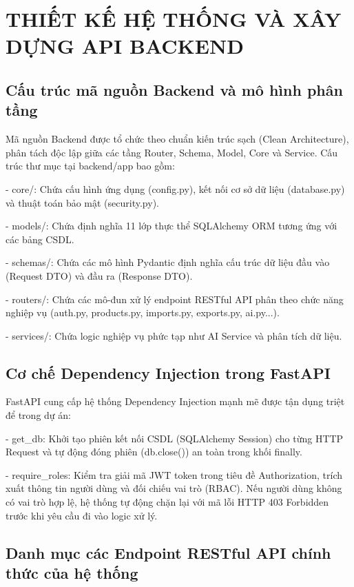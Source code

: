 \chapter{THIẾT KẾ HỆ THỐNG VÀ XÂY DỰNG API BACKEND}

\section{Cấu trúc mã nguồn Backend và mô hình phân tầng}

Mã nguồn Backend được tổ chức theo chuẩn kiến trúc sạch (Clean Architecture), phân tách độc lập giữa các tầng Router, Schema, Model, Core và Service. Cấu trúc thư mục tại backend/app bao gồm:

- core/: Chứa cấu hình ứng dụng (config.py), kết nối cơ sở dữ liệu (database.py) và thuật toán bảo mật (security.py).

- models/: Chứa định nghĩa 11 lớp thực thể SQLAlchemy ORM tương ứng với các bảng CSDL.

- schemas/: Chứa các mô hình Pydantic định nghĩa cấu trúc dữ liệu đầu vào (Request DTO) và đầu ra (Response DTO).

- routers/: Chứa các mô-đun xử lý endpoint RESTful API phân theo chức năng nghiệp vụ (auth.py, products.py, imports.py, exports.py, ai.py...).

- services/: Chứa logic nghiệp vụ phức tạp như AI Service và phân tích dữ liệu.

\section{Cơ chế Dependency Injection trong FastAPI}

FastAPI cung cấp hệ thống Dependency Injection mạnh mẽ được tận dụng triệt để trong dự án:

- get\_db: Khởi tạo phiên kết nối CSDL (SQLAlchemy Session) cho từng HTTP Request và tự động đóng phiên (db.close()) an toàn trong khối finally.

- require\_roles: Kiểm tra giải mã JWT token trong tiêu đề Authorization, trích xuất thông tin người dùng và đối chiếu vai trò (RBAC). Nếu người dùng không có vai trò hợp lệ, hệ thống tự động chặn lại với mã lỗi HTTP 403 Forbidden trước khi yêu cầu đi vào logic xử lý.

\section{Danh mục các Endpoint RESTful API chính thức của hệ thống}

